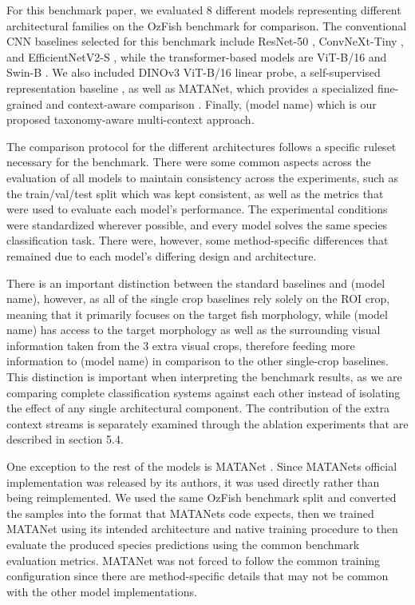 \documentclass[preprint,12pt]{elsarticle}
\begin{document}
For this benchmark paper, we evaluated 8 different models representing
different architectural families on the OzFish benchmark for comparison.
The conventional CNN baselines selected for this benchmark include
ResNet-50 \cite{ref39}, ConvNeXt-Tiny
\cite{ref41}, and EfficientNetV2-S
\cite{ref40}, while the transformer-based models
are ViT-B/16 \cite{ref36} and Swin-B
\cite{ref38}. We also included DINOv3 ViT-B/16
linear probe, a self-supervised representation baseline
\cite{ref25}, as well as MATANet, which provides
a specialized fine-grained and context-aware comparison
\cite{ref26}. Finally, (model name) which is our
proposed taxonomy-aware multi-context approach.

The comparison protocol for the different architectures follows a
specific ruleset necessary for the benchmark. There were some common
aspects across the evaluation of all models to maintain consistency
across the experiments, such as the train/val/test split which was kept
consistent, as well as the metrics that were used to evaluate each
model's performance. The experimental conditions were standardized
wherever possible, and every model solves the same species
classification task. There were, however, some method-specific
differences that remained due to each model's differing design and
architecture.

There is an important distinction between the standard baselines and
(model name), however, as all of the single crop baselines rely solely
on the ROI crop, meaning that it primarily focuses on the target fish
morphology, while (model name) has access to the target morphology as
well as the surrounding visual information taken from the 3 extra visual
crops, therefore feeding more information to (model name) in comparison
to the other single-crop baselines. This distinction is important when
interpreting the benchmark results, as we are comparing complete
classification systems against each other instead of isolating the
effect of any single architectural component. The contribution of the
extra context streams is separately examined through the ablation
experiments that are described in section 5.4.

One exception to the rest of the models is MATANet
\cite{ref26}. Since MATANet\textquotesingle s
official implementation was released by its authors, it was used
directly rather than being reimplemented. We used the same OzFish
benchmark split and converted the samples into the format that
MATANet\textquotesingle s code expects, then we trained MATANet using
its intended architecture and native training procedure to then evaluate
the produced species predictions using the common benchmark evaluation
metrics. MATANet was not forced to follow the common training
configuration since there are method-specific details that may not be
common with the other model implementations.
\end{document}
